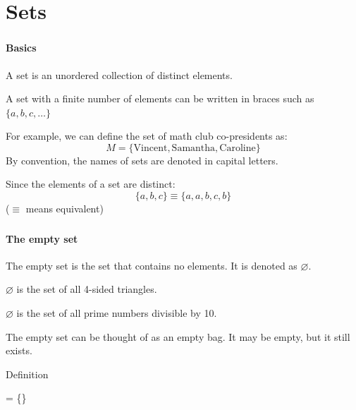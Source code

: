 	\section{Sets}
	\begin{frame}
		\frametitle{\secname}
		\framesubtitle{Basics}
		A set is an unordered collection of distinct elements.

		A set with a finite number of elements can be written in braces such as $\{a, b, c, \dots\}$

		For example, we can define the set of math club co-presidents as:
		\[M = \{\text{Vincent}, \text{Samantha}, \text{Caroline}\}\]
		By convention, the names of sets are denoted in capital letters.

		Since the elements of a set are distinct:
		\[\{a, b, c\} \equiv \{a, a, b, c, b\}\]
		($\equiv$ means equivalent)
	\end{frame}
	\begin{frame}
		\frametitle{\secname}
		\framesubtitle{The empty set}
		The empty set is the set that contains no elements. It is denoted as $\varnothing$.
		
		\begin{examples}
			$\varnothing$ is the set of all 4-sided triangles.

			$\varnothing$ is the set of all prime numbers divisible by 10.
		\end{examples}
		The empty set can be thought of as an empty bag. It may be empty, but it still exists.
		\begin{block}{Definition}
			\begin{compactmath}[\Huge]
				\varnothing = \{\}
			\end{compactmath}
		\end{block}
	\end{frame}
